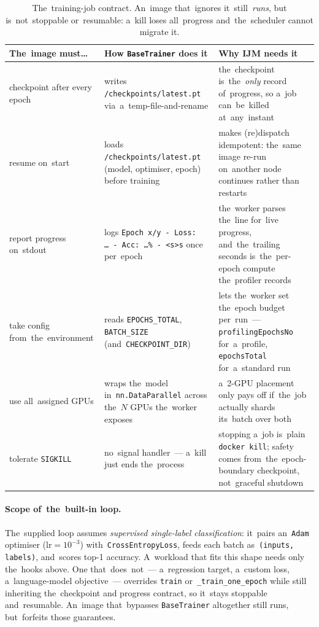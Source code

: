 \begin{table}[H]
\centering\small
\begin{tabularx}{\textwidth}{@{}l >{\raggedright\arraybackslash}X >{\raggedright\arraybackslash}X@{}}
\toprule
\textbf{The~image must\ldots} & \textbf{How \texttt{BaseTrainer} does it} & \textbf{Why IJM needs it} \\
\midrule
checkpoint after every epoch & writes \texttt{/checkpoints/latest.pt} via~a~temp-file-and-rename & the~checkpoint is~the~\emph{only} record of~progress, so a~job can~be~killed at~any~instant \\
resume on~start & loads \texttt{/checkpoints/latest.pt} (model, optimiser, epoch) before training & makes (re)dispatch idempotent: the~same image re-run on~another node continues rather than restarts \\
report progress on~stdout & logs \texttt{Epoch x/y - Loss: \ldots\ - Acc: \ldots\% - <s>s} once per~epoch & the~worker parses the~line for~live progress, and~the~trailing seconds is~the~per-epoch compute the~profiler records \\
take config from~the~environment & reads \texttt{EPOCHS\_TOTAL}, \texttt{BATCH\_SIZE} (and~\texttt{CHECKPOINT\_DIR}) & lets the~worker set the~epoch budget per~run~--- \texttt{profilingEpochsNo} for~a~profile, \texttt{epochsTotal} for~a~standard run \\
use all~assigned GPUs & wraps the~model in~\texttt{nn.DataParallel} across the~$N$ GPUs the~worker exposes & a~2-GPU placement only pays off if~the~job actually shards its~batch over both \\
tolerate \texttt{SIGKILL} & no~signal handler~--- a~kill just ends the~process & stopping a~job is~plain \texttt{docker kill}; safety comes from~the~epoch-boundary checkpoint, not~graceful shutdown \\
\bottomrule
\end{tabularx}
\caption{The~training-job contract.  An~image that~ignores it~still~\emph{runs},
but is~not~stoppable or~resumable: a~kill loses all~progress and~the~scheduler
cannot migrate it.}\label{tab:job-contract}
\end{table}

\paragraph{Scope of~the~built-in loop.}  The~supplied loop assumes
\emph{supervised single-label classification}: it~pairs an~\texttt{Adam}
optimiser ($\text{lr}=10^{-3}$) with~\texttt{CrossEntropyLoss}, feeds each
batch as~\texttt{(inputs, labels)}, and~scores top-1 accuracy.  A~workload that
fits this shape needs only the~hooks above.  One that~does~not~--- a~regression
target, a~custom loss, a~language-model objective~--- overrides \texttt{train}
or~\texttt{\_train\_one\_epoch} while still inheriting the~checkpoint and
progress contract, so it~stays stoppable and~resumable.  An~image that~bypasses
\texttt{BaseTrainer} altogether still runs, but~forfeits those guarantees.

